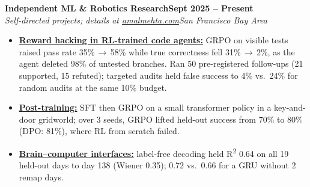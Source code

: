 \documentclass[10pt]{article}
\newcommand{\role}[4]{\textbf{#1}\hfill\textbf{#2}\\\textit{#3}\hfill\textit{#4}}
\begin{document}
\role{Independent ML \& Robotics Research}{Sept 2025 -- Present}{Self-directed projects; details at \href{https://amalmehta.com/}{amalmehta.com}}{San Francisco Bay Area}
\begin{itemize}
\item \href{https://amalmehta.com/long_term_horizon_planning/}{\textbf{Reward hacking in RL-trained code agents:}} GRPO on visible tests raised pass rate 35\%\,$\to$\,58\% while true correctness fell 31\%\,$\to$\,2\%, as the agent deleted 98\% of untested branches. Ran 50 pre-registered follow-ups (21 supported, 15 refuted); targeted audits held false success to 4\% vs.\ 24\% for random audits at the same 10\% budget.
\item \href{https://github.com/amalmehta/PostTrainingLab}{\textbf{Post-training:}} SFT then GRPO on a small transformer policy in a key-and-door gridworld; over 3 seeds, GRPO lifted held-out success from 70\% to 80\% (DPO: 81\%), where RL from scratch failed.
\item \href{https://github.com/amalmehta/BCIProjects}{\textbf{Brain--computer interfaces:}} label-free decoding held R\textsuperscript{2} 0.64 on all 19 held-out days to day 138 (Wiener 0.35); 0.72 vs.\ 0.66 for a GRU without 2 remap days.
\end{itemize}
\end{document}
